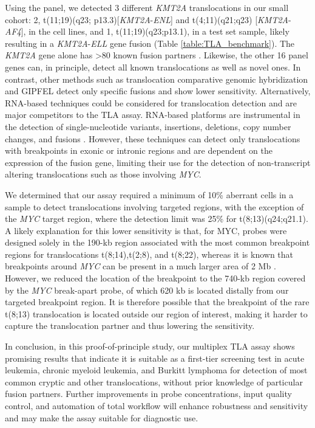 Using the panel, we detected 3 different \textsl{KMT2A} translocations in our small cohort: 2, t(11;19)(q23; p13.3)[\textsl{KMT2A}-\textsl{ENL}] and t(4;11)(q21;q23) [\textsl{KMT2A}-\textsl{AF4}], in the cell lines, and 1, t(11;19)(q23;p13.1), in a test set sample, likely resulting in a \textsl{KMT2A}-\textsl{ELL} gene fusion (Table \ref{table:TLA_benchmark}).
The \textsl{KMT2A} gene alone has \textgreater 80 known fusion partners \cite{Meyer_2013,Winters_2017}. 
Likewise, the other 16 panel genes can, in principle, detect all known translocations as well as novel ones. 
In contrast, other methods such as translocation comparative genomic hybridization \cite{Greisman_2011} and GIPFEL \cite{Fueller_2014} detect only specific fusions and show lower sensitivity. 
Alternatively, RNA-based techniques could be considered for translocation detection \cite{Lilljebjorn_2013, Torkildsen_2015, Scolnick_2015, Levin_2009, Zheng_2014} and are major competitors to the TLA assay. 
RNA-based platforms are instrumental in the detection of single-nucleotide variants, insertions, deletions, copy number changes, and fusions \cite{Zheng_2014}.
However, these techniques can detect only translocations with breakpoints in exonic or intronic regions and are dependent on the expression of the fusion gene, limiting their use for the detection of non-transcript altering translocations such as those involving \textsl{MYC}. 

We determined that our assay required a minimum of 10\% aberrant cells in a sample to detect translocations involving targeted regions, with the exception of the \textsl{MYC} target region, where the detection limit was 25\% for t(8;13)(q24;q21.1). 
A likely explanation for this lower sensitivity is that, for MYC, probes were designed solely in the 190-kb region associated with the most common breakpoint regions for translocations t(8;14),t(2;8), and t(8;22), whereas it is known that breakpoints around \textsl{MYC} can be present in a much larger area of 2 Mb \cite{van_den_Berg_2017}. 
However, we reduced the location of the breakpoint to the 740-kb region covered by the \textsl{MYC} break-apart probe, of which 620 kb is located distally from our targeted breakpoint region.
It is therefore possible that the breakpoint of the rare t(8;13) translocation is located outside our region of interest, making it harder to capture the translocation partner and thus lowering the sensitivity.

In conclusion, in this proof-of-principle study, our multiplex TLA assay shows promising results that indicate it is suitable as a first-tier screening test in acute leukemia, chronic myeloid leukemia, and Burkitt lymphoma for detection of most common cryptic and other translocations, without prior knowledge of particular fusion partners.
Further improvements in probe concentrations, input quality control, and automation of total workflow will enhance robustness and sensitivity and may make the assay suitable for diagnostic use.


